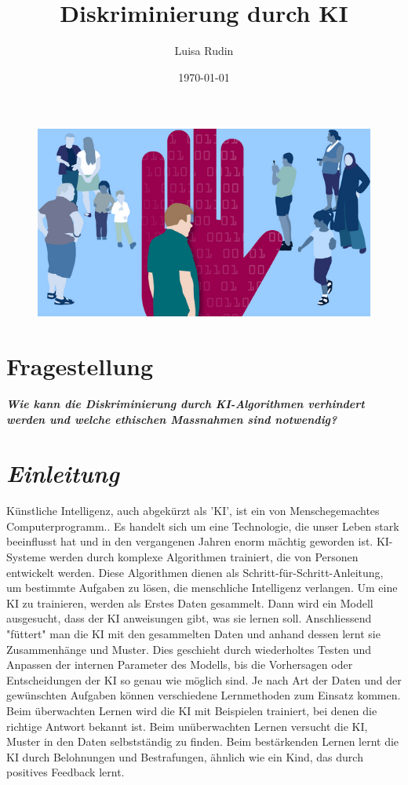 \documentclass{article}
\title{Diskriminierung durch KI}
\author{Luisa Rudin}
\date{\today}
\begin{document}
\maketitle

\begin{figure}[ht]
    \centering
    \includegraphics[width=1\textwidth]{KI Diskriminierung.jpg}
    \caption{}
    \label{fig:Diskriminierung}
\end{figure}

\section{Fragestellung}
    \textbf{\textit{
    Wie kann die Diskriminierung durch KI-Algorithmen verhindert werden und welche ethischen Massnahmen sind notwendig?}}


\tableofcontents

\section{\textit{Einleitung}}
Künstliche Intelligenz, auch abgekürzt als 'KI', ist ein von Menschegemachtes Computerprogramm.. Es handelt sich um eine Technologie, die unser Leben stark beeinflusst hat und in den vergangenen Jahren enorm mächtig geworden ist. KI-Systeme werden durch komplexe Algorithmen trainiert, die von Personen entwickelt werden. Diese Algorithmen dienen als Schritt-für-Schritt-Anleitung, um bestimmte Aufgaben zu lösen, die menschliche Intelligenz verlangen.  Um eine KI zu trainieren, werden als Erstes Daten gesammelt. Dann wird ein Modell ausgesucht, dass der KI anweisungen gibt, was sie lernen soll. Anschliessend "füttert" man die KI mit den gesammelten Daten und anhand dessen lernt sie Zusammenhänge und Muster. Dies geschieht durch wiederholtes Testen und Anpassen der internen Parameter des Modells, bis die Vorhersagen oder Entscheidungen der KI so genau wie möglich sind. Je nach Art der Daten und der gewünschten Aufgaben können verschiedene Lernmethoden zum Einsatz kommen. Beim überwachten Lernen wird die KI mit Beispielen trainiert, bei denen die richtige Antwort bekannt ist. Beim unüberwachten Lernen versucht die KI, Muster in den Daten selbstständig zu finden. Beim bestärkenden Lernen lernt die KI durch Belohnungen und Bestrafungen, ähnlich wie ein Kind, das durch positives Feedback lernt.
\end{document}
